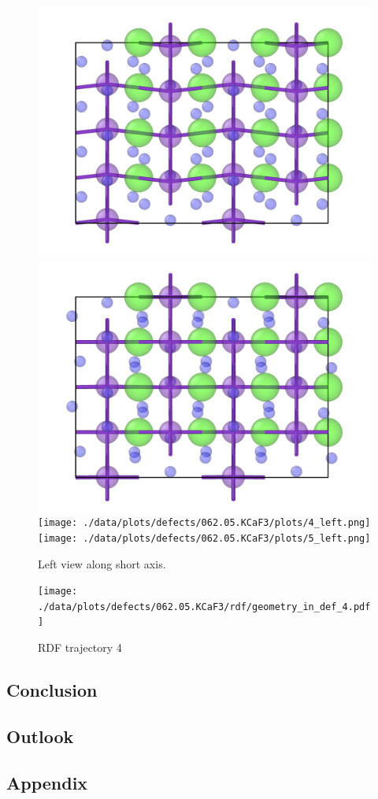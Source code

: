 \documentclass[nobib,a4paper,twoside,notoc,justified,marginals=justified]{tufte-book}
\begin{document}
\begin{figure}
	\includegraphics[width=.5\textwidth]{./data/plots/defects/062.05.KCaF3/plots/ref_left.png} \hfill
	\includegraphics[width=.5\textwidth]{./data/plots/defects/062.05.KCaF3/plots/2_left.png} \\
	\texttt{[image: ./data/plots/defects/062.05.KCaF3/plots/4\_left.png]} \hfill
	\texttt{[image: ./data/plots/defects/062.05.KCaF3/plots/5\_left.png]}
	\caption{Left view along short axis.}
	\label{}
\end{figure}

\begin{figure}
	\texttt{[image: ./data/plots/defects/062.05.KCaF3/rdf/geometry\_in\_def\_4.pdf]}
	\caption{RDF trajectory 4}
	\label{}
\end{figure}

\chapter{Conclusion}

\chapter{Outlook}






\begin{appendices}
  \part*{Appendix}
  
\end{appendices}

\backmatter



\end{document}
